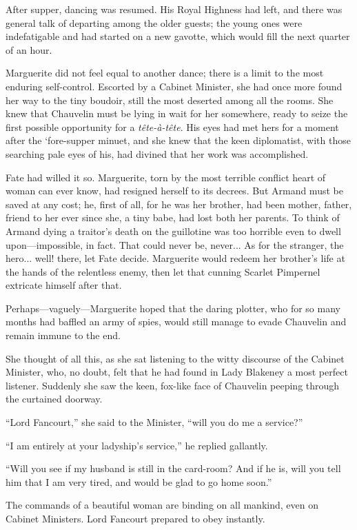 \documentclass[paper=5.5in:8.5in,BCOR=7mm,twoside,DIV=calc,12pt,usegeometry,chapterprefix,endperiod,headings=big]{scrbook}
\begin{document}
After supper, dancing was resumed. His Royal Highness had left, and there was general talk of departing among the older guests; the young ones were indefatigable and had started on a new gavotte, which would fill the next quarter of an hour.

Marguerite did not feel equal to another dance; there is a limit to the most enduring self-control. Escorted by a Cabinet Minister, she had once more found her way to the tiny boudoir, still the most deserted among all the rooms. She knew that Chauvelin must be lying in wait for her somewhere, ready to seize the first possible opportunity for a \textit{tête-à-tête}. His eyes had met hers for a moment after the `fore-supper minuet, and she knew that the keen diplomatist, with those searching pale eyes of his, had divined that her work was accomplished.

Fate had willed it so. Marguerite, torn by the most terrible conflict heart of woman can ever know, had resigned herself to its decrees. But Armand must be saved at any cost; he, first of all, for he was her brother, had been mother, father, friend to her ever since she, a tiny babe, had lost both her parents. To think of Armand dying a traitor's death on the guillotine was too horrible even to dwell upon---impossible, in fact. That could never be, never... As for the stranger, the hero... well! there, let Fate decide. Marguerite would redeem her brother's life at the hands of the relentless enemy, then let that cunning Scarlet Pimpernel extricate himself after that.

Perhaps---vaguely---Marguerite hoped that the daring plotter, who for so many months had baffled an army of spies, would still manage to evade Chauvelin and remain immune to the end.

She thought of all this, as she sat listening to the witty discourse of the Cabinet Minister, who, no doubt, felt that he had found in Lady Blakeney a most perfect listener. Suddenly she saw the keen, fox-like face of Chauvelin peeping through the curtained doorway.

\enquote{Lord Fancourt,} she said to the Minister, \enquote{will you do me a service?}

\enquote{I am entirely at your ladyship's service,} he replied gallantly.

\enquote{Will you see if my husband is still in the card-room? And if he is, will you tell him that I am very tired, and would be glad to go home soon.}

The commands of a beautiful woman are binding on all mankind, even on Cabinet Ministers. Lord Fancourt prepared to obey instantly.
\end{document}
